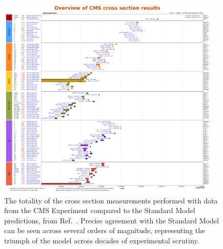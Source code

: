 \begin{figure}[htb]
    \centering
    \includegraphics[width=0.95\textwidth]{fig/cms/cms_xsecs_2023.pdf}
    \caption[The totality of the cross section measurements performed with data from the CMS Experiment]{
        The totality of the cross section measurements performed with data from the CMS Experiment compared to the Standard Model predictions, from Ref.~\cite{CMSXSecs}. 
        Precise agreement with the Standard Model can be seen across several orders of magnitude, representing the triumph of the model across decades of experimental scrutiny. 
    }
    \label{fig:cms_xsecs}
\end{figure}

